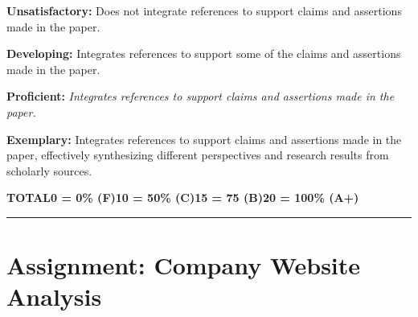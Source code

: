 \documentclass[
]{book}
\begin{document}
\textbf{Unsatisfactory:} Does not integrate references to support claims and assertions made in the paper.

\textbf{Developing:} Integrates references to support some of the claims and assertions made in the paper.

\textbf{Proficient:} \emph{Integrates references to support claims and assertions made in the paper.}

\textbf{Exemplary:} Integrates references to support claims and assertions made in the paper, effectively synthesizing different perspectives and research results from scholarly sources.

\textbar{}\textbf{TOTAL}\textbar{}\textbf{0 = 0\% (F)}\textbar{}\textbf{10 = 50\% (C)}\textbar{}\textbf{15 = 75 (B)}\textbar{}\textbf{20 = 100\% (A+)}\textbar{}

\begin{center}\rule{0.5\linewidth}{0.5pt}\end{center}

\hypertarget{assignment-company-website-analysis}{%
\section*{Assignment: Company Website Analysis}\label{assignment-company-website-analysis}}
\end{document}
